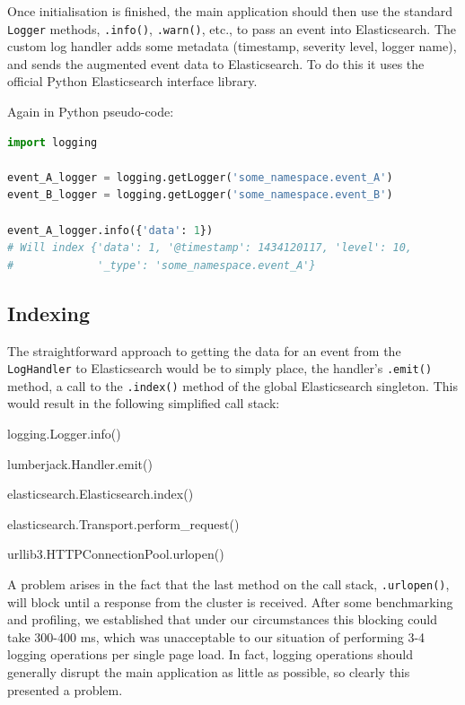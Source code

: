 \documentclass[a4paper,11pt]{article} %
\begin{document}
Once initialisation is finished, the main application should then use the
standard \texttt{Logger} methods, \texttt{.info()}, \texttt{.warn()}, etc., to
pass an event into Elasticsearch.  The custom log handler adds some metadata
(timestamp, severity level, logger name), and sends the augmented event data to
Elasticsearch.  To do this it uses the official Python Elasticsearch interface
library.

Again in Python pseudo-code:

\begin{lstlisting}[language=Python,basicstyle=\ttfamily]
import logging

event_A_logger = logging.getLogger('some_namespace.event_A')
event_B_logger = logging.getLogger('some_namespace.event_B')

event_A_logger.info({'data': 1})
# Will index {'data': 1, '@timestamp': 1434120117, 'level': 10,
#             '_type': 'some_namespace.event_A'}
\end{lstlisting}

\subsection{Indexing}
\label{sec:implementation.indexing}
The straightforward approach to getting the data for an event from the
\texttt{LogHandler} to Elasticsearch would be to simply place, the handler's
\texttt{.emit()} method, a call to the \texttt{.index()} method of the global
Elasticsearch singleton.  This would result in the following simplified call
stack:
\begin{enumerate*}
  \item logging.Logger.info()
  \item lumberjack.Handler.emit()
  \item elasticsearch.Elasticsearch.index()
  \item elasticsearch.Transport.perform\_request()
  \item urllib3.HTTPConnectionPool.urlopen()
\end{enumerate*}

A problem arises in the fact that the last method on the call stack,
\texttt{.urlopen()}, will block until a response from the cluster is received.
After some benchmarking and profiling, we established that under our
circumstances this blocking could take 300-400 ms, which was unacceptable to
our situation of performing 3-4 logging operations per single page load.  In
fact, logging operations should generally disrupt the main application as
little as possible, so clearly this presented a problem.
\end{document}
